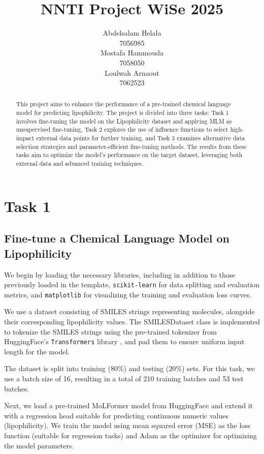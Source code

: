 \documentclass[11pt]{article}
\title{NNTI Project WiSe 2025}
\author{ Abdelsalam Helala \\
  7056985 \\\And
  Mostafa Hammouda \\
  7058050 \\\And
  Loulwah Arnaout \\
    7062523 \\}
\begin{document}
\maketitle
\begin{abstract}
This project aims to enhance the performance of a pre-trained chemical language model for predicting lipophilicity. The project is divided into three tasks: Task 1 involves fine-tuning the model on the Lipophilicity dataset and applying MLM as unsupervised fine-tuning, Task 2 explores the use of influence functions to select high-impact external data points for further training, and Task 3 examines alternative data selection strategies and parameter-efficient fine-tuning methods. The results from these tasks aim to optimize the model's performance on the target dataset, leveraging both external data and advanced training techniques.
\end{abstract}

\section{Task 1}
\subsection{Fine-tune a Chemical Language Model on Lipophilicity}
We begin by loading the necessary libraries, including in addition to those previously loaded in the template, \texttt{scikit-learn} \cite{scikit-learn} for data splitting and evaluation metrics, and \texttt{matplotlib} \cite{Hunter:2007} for visualizing the training and evaluation loss curves.

We use a dataset consisting of SMILES strings representing molecules, alongside their corresponding lipophilicity values. The SMILESDataset class is implemented to tokenize the SMILES strings using the pre-trained tokenizer from HuggingFace's \texttt{Transformers} library \cite{Wolf2020Transformers}, and pad them to ensure uniform input length for the model.

The dataset is split into training ($80\%$) and testing ($20\%$) sets. For this task, we use a batch size of 16, resulting in a total of 210 training batches and 53 test batches.

Next, we load a pre-trained MoLFormer model from HuggingFace and extend it with a regression head suitable for predicting continuous numeric values (lipophilicity). We train the model using mean squared error (MSE) as the loss function (suitable for regression tasks) and Adam as the optimizer \cite{Kingma2014Adam} for optimizing the model parameters.
\end{document}
